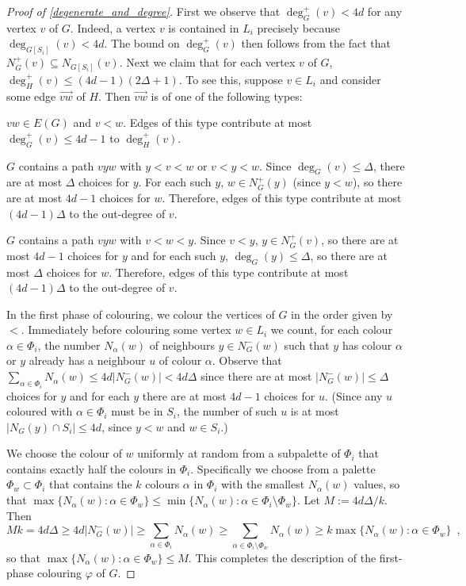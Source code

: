 \documentclass{patmorin}
\begin{document}
\begin{proof}[Proof of \cref{degenerate_and_degree}]
  First we observe that $\deg^+_G(v)< 4d$ for any vertex $v$ of $G$. Indeed, a vertex $v$ is contained in $L_i$ precisely because $\deg_{G[S_i]}(v)<4d$.  The bound on $\deg^+_G(v)$ then follows from the fact that $N^+_{G}(v)\subseteq N_{G[S_i]}(v)$.  Next we claim that for each vertex $v$ of $G$, $\deg^+_{H}(v)\le (4d-1)(2\Delta+1)$.  To see this, suppose $v\in L_i$ and consider some edge $\overrightarrow{vw}$ of $H$.  Then  $\overrightarrow{vw}$ is of one of the following types:
  \begin{compactenum}[(T1)]
    \item $vw\in E(G)$ and $v<w$. Edges of this type contribute at most $\deg^+_{G}(v)\le 4d-1$ to $\deg^+_{H}(v)$.
    \item $G$ contains a path $vyw$ with $y < v < w$ or $v < y < w$.  Since $\deg_G(v)\le\Delta$, there are at most $\Delta$ choices for $y$.  For each such $y$, $w\in N^+_G(y)$ (since $y<w$), so there are at most $4d-1$ choices for $w$.  Therefore, edges of this type contribute at most $(4d-1)\Delta$ to the out-degree of $v$.
    \item $G$ contains a path $vyw$ with $v < w < y$.  Since $v<y$, $y\in N_G^+(v)$, so there are at most $4d-1$ choices for $y$ and for each such $y$, $\deg_G(y)\le\Delta$, so there are at most $\Delta$ choices for $w$.  Therefore, edges of this type contribute at most $(4d-1)\Delta$ to the out-degree of $v$.
  \end{compactenum}
  In the first phase of colouring, we colour the vertices of $G$ in the order given by $<$.  Immediately before colouring some vertex $w\in L_i$ we count, for each colour $\alpha\in \Phi_i$, the number $N_\alpha(w)$ of neighbours $y\in N^-_G(w)$ such that $y$ has colour $\alpha$ or $y$ already has a neighbour $u$ of colour $\alpha$. Observe that $\sum_{\alpha\in \Phi_i} N_\alpha(w)\le 4d|N^-_G(w)|< 4d\Delta$ since there are at most $|N^-_G(w)|\le\Delta$ choices for $y$ and for each $y$ there are at most $4d-1$ choices for $u$.  (Since any $u$ coloured with $\alpha\in\Phi_i$ must be in $S_i$, the number of such $u$ is at most $|N_G(y)\cap S_i|\le 4d$, since $y < w$ and $w\in S_i$.)

  We choose the colour of $w$ uniformly at random from a subpalette of $\Phi_i$ that contains exactly half the colours in $\Phi_i$.  Specifically we choose from a palette $\Phi_w\subset \Phi_i$ that contains the $k$ colours $\alpha$ in $\Phi_i$ with the smallest $N_\alpha(w)$ values, so that  $\max\{N_\alpha(w):\alpha\in \Phi_w\}\le\min\{N_\alpha(w):\alpha\in\Phi_i\setminus\Phi_w\}$.  Let $M:=4d\Delta/k$.  Then
  \[
    Mk = 4d\Delta \ge 4d|N^-_G(w)| \ge \sum_{\alpha\in \Phi_i} N_\alpha(w) \ge \sum_{\alpha\in\Phi_i\setminus\Phi_w}N_\alpha(w) \ge k\max\{N_\alpha(w):\alpha\in \Phi_w\} \enspace ,
  \]
  so that $\max\{N_\alpha(w):\alpha\in \Phi_w\}\le M$.  This completes the description of the first-phase colouring $\varphi$ of $G$.


\end{proof}
\end{document}
